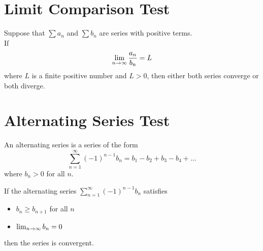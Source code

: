 \section{Limit Comparison Test}

\begin{theorem}
  Suppose that \(\sum a_{n}\) and \(\sum b_{n}\) are series with positive terms. \\
  If
  \[
    \lim_{n \to \infty} \frac{a_{n}}{b_{n}} = L
  \]
  where \(L\) is a finite positive number and \(L > 0\), then either both series converge or both diverge.
\end{theorem}



\section{Alternating Series Test}

\begin{definition}
  An alternating series is a series of the form
  \[
    \sum_{n=1}^{\infty} (-1)^{n-1} b_{n} = b_{1} - b_{2} + b_{3} - b_{4} + \dots
  \]
  where \(b_{n} > 0\) for all \(n\).
\end{definition}

\begin{theorem}
  If the alternating series \(\sum_{n=1}^{\infty} (-1)^{n-1} b_{n}\) satisfies
  \begin{itemize}
    \item \(b_{n} \ge b_{n+1}\) for all \(n\)
    \item \(\lim_{n \to \infty} b_{n} = 0\)
  \end{itemize}
  then the series is convergent.
\end{theorem}

